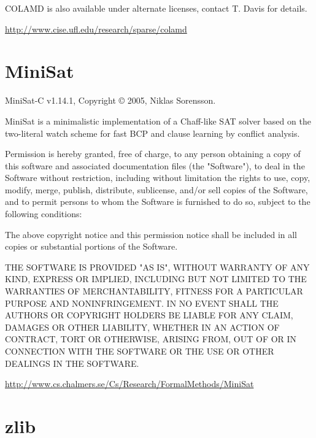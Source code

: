 COLAMD is also available under alternate licenses, contact T. Davis for
details.


\noindent
\url{http://www.cise.ufl.edu/research/sparse/colamd}



\section{MiniSat}

\noindent
MiniSat-C v1.14.1, Copyright {\copyright} 2005, Niklas Sorensson.


MiniSat is a minimalistic implementation of a Chaff-like SAT solver
based on the two-literal watch scheme for fast BCP and clause learning
by conflict analysis.

\newpage


Permission is hereby granted, free of charge, to any person obtaining a
copy of this software and associated documentation files (the
"Software"), to deal in the Software without restriction, including
without limitation the rights to use, copy, modify, merge, publish,
distribute, sublicense, and/or sell copies of the Software, and to
permit persons to whom the Software is furnished to do so, subject to
the following conditions:

The above copyright notice and this permission notice shall be included
in all copies or substantial portions of the Software.

THE SOFTWARE IS PROVIDED "AS IS", WITHOUT WARRANTY OF ANY KIND, EXPRESS
OR IMPLIED, INCLUDING BUT NOT LIMITED TO THE WARRANTIES OF
MERCHANTABILITY, FITNESS FOR A PARTICULAR PURPOSE AND
NONINFRINGEMENT. IN NO EVENT SHALL THE AUTHORS OR COPYRIGHT HOLDERS BE
LIABLE FOR ANY CLAIM, DAMAGES OR OTHER LIABILITY, WHETHER IN AN ACTION
OF CONTRACT, TORT OR OTHERWISE, ARISING FROM, OUT OF OR IN CONNECTION
WITH THE SOFTWARE OR THE USE OR OTHER DEALINGS IN THE SOFTWARE.


\noindent
\url{http://www.cs.chalmers.se/Cs/Research/FormalMethods/MiniSat}


\section{zlib}

